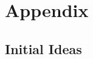 \documentclass{article}
\begin{document}


% 
% 

\renewcommand{\thesection}{\Alph{section}}

\appendix

\section{Appendix}
\subsection{Initial Ideas}
\end{document}
